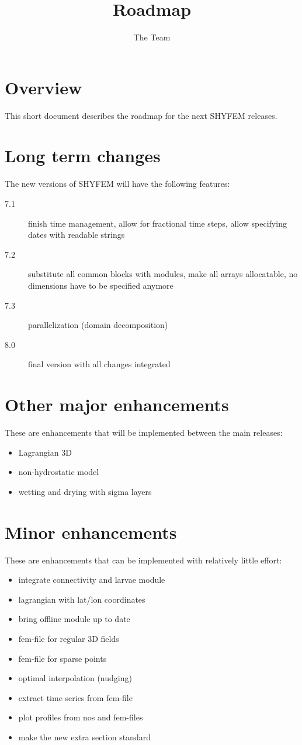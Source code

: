 \documentclass[12pt,draft]{article}
\title{Roadmap \shyfem{}}
\author{The \shyfem{} Team}
\newcommand{\shyfem}{SHYFEM}
\begin{document}
\maketitle

\section{Overview}

This short document describes the roadmap for the next \shyfem{}
releases.

\section{Long term changes}

The new versions of \shyfem{} will have the following features:
\begin{description}
\item[7.1] finish time management, allow for fractional time steps,
allow specifying dates with readable strings
\item[7.2] substitute all common blocks with modules, make all
arrays allocatable, no dimensions have to be specified anymore
\item[7.3] parallelization (domain decomposition)
\item[8.0] final version with all changes integrated
\end{description}

\section{Other major enhancements}

These are enhancements that will be implemented between
the main releases:
\begin{itemize}
\item Lagrangian 3D
\item non-hydrostatic model
\item wetting and drying with sigma layers
\end{itemize}

\section {Minor enhancements}

These are enhancements that can be implemented with 
relatively little effort:
\begin{itemize}
\item integrate connectivity and larvae module
\item lagrangian with lat/lon coordinates
\item bring offline module up to date
\item fem-file for regular 3D fields
\item fem-file for sparse points
\item optimal interpolation (nudging)
\item extract time series from fem-file
\item plot profiles from nos and fem-files
\item make the new extra section standard
\end{itemize}
\end{document}
